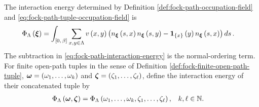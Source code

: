 \documentclass[11pt,a4paper]{article}
\theoremstyle{plain}
\theoremstyle{definition}
\theoremstyle{remark}
\begin{document}
The interaction energy determined by Definition \ref{def:fock-path-occupation-field} and \eqref{eq:fock-path-tuple-occupation-field} is \begin{equation}
\begin{aligned}
\Phi_{\Lambda} \left( \boldsymbol{\xi} \right)
& =
\int_{\left[ 0,\,\beta \right]}
\sum_{x,y \in \Lambda}
v \left( x,y \right)
\left( 
n_{\boldsymbol{\xi}} \left( s,x \right)n_{\boldsymbol{\xi}} \left( s,y \right)
-
\boldsymbol{1}_{\left\{ x \right\}} \left( y \right)n_{\boldsymbol{\xi}} \left( s,x \right) \right)
\mathop{d s}.
\end{aligned}
\label{eq:fock-path-interaction-energy}
\end{equation} The subtraction in \eqref{eq:fock-path-interaction-energy} is the normal-ordering term. For finite open-path tuples in the sense of Definition \ref{def:fock-finite-open-path-tuple}, \(\boldsymbol{\omega}=\left( \omega_1,\ldots,\omega_k \right)\) and \(\boldsymbol{\zeta}=\left( \zeta_1,\ldots,\zeta_{\ell} \right)\), define the interaction energy of their concatenated tuple by \begin{equation}
\begin{aligned}
\Phi_{\Lambda} \left( \boldsymbol{\omega},\boldsymbol{\zeta} \right)
& =
\Phi_{\Lambda} \left( \omega_1,\ldots,\omega_k,\zeta_1,\ldots,\zeta_{\ell} \right),
&
k,\ell
& \in
\mathbb{N}.
\end{aligned}
\label{eq:fock-concatenated-path-interaction-energy}
\end{equation}
\end{document}
